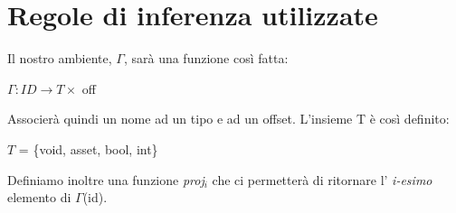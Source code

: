 \documentclass[12pt, a4paper]{report}
\begin{document}
\section{Regole di inferenza utilizzate}
Il nostro ambiente, $\Gamma$, sarà una funzione così fatta:
\begin{center}
    $\Gamma : ID \rightarrow T \times$ off
\end{center}
Associerà quindi un nome ad un tipo e ad un offset. L'insieme T è così definito: 
\begin{center}
    $T$ = \{void, asset, bool, int\}\\
   
\end{center}
Definiamo inoltre una funzione \emph{proj$_i$} che ci permetterà di ritornare l' \emph{i-esimo} elemento di $\Gamma$(id).
\end{document}
